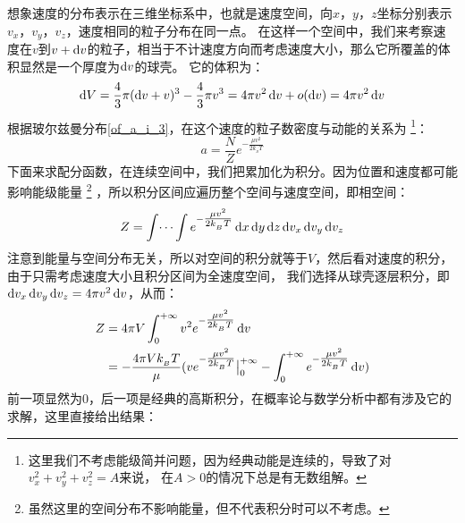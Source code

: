        \begin{prove}            
            想象速度的分布表示在三维坐标系中，也就是速度空间，向$x$，$y$，$z$坐标分别表示$v_x$，$v_y$，$v_z$，速度相同的粒子分布在同一点。
            在这样一个空间中，我们来考察速度在$v$到$v+\dif{v}$的粒子，相当于不计速度方向而考虑速度大小，那么它所覆盖的体积显然是一个厚度为$\dif{v}$的球壳。
            它的体积为：
            \begin{equation}
                \dif{V} = \frac{4}{3}\pi (\dif{v}+v)^{3} - \frac{4}{3}\pi v^{3} = 4\pi v^{2}\dif{v} + o(\dif{v}) = 4\pi v^{2}\dif{v}
            \end{equation}
            根据玻尔兹曼分布\ref{of_a_i_3}，在这个速度的粒子数密度与动能的关系为
            \footnote{这里我们不考虑能级简并问题，因为经典动能是连续的，导致了对$v_{x}^{2}+v_{y}^{2}+v_{z}^{2}=A$来说，
            在$A>0$的情况下总是有无数组解。}：
            \begin{equation}
                a= \frac{N}{Z} e^{-\tfrac{\mu v^{2}}{2k_{_B}T}}
            \end{equation}
            下面来求配分函数，在连续空间中，我们把累加化为积分。因为位置和速度都可能影响能级能量
            \footnote{虽然这里的空间分布不影响能量，但不代表积分时可以不考虑。}
            ，所以积分区间应遍历整个空间与速度空间，即相空间：
            \begin{equation}
                Z =\int \dots \int e^{-\tfrac{\mu v^{2}}{2k_{_B}T}} \dif{x}\dif{y}\dif{z}\dif{v_x}\dif{v_y}\dif{v_z}
            \end{equation}
            注意到能量与空间分布无关，所以对空间的积分就等于$V$，然后看对速度的积分，由于只需考虑速度大小且积分区间为全速度空间，
            我们选择从球壳逐层积分，即$\dif{v_x}\dif{v_y}\dif{v_z} = 4\pi v^{2}\dif{v}$，从而：
            \begin{equation}
                \begin{aligned}
                    Z &= 4\pi V\int_{0}^{+\infty} v^{2} e^{-\tfrac{\mu v^{2}}{2k_{_B}T}} \dif{v}\\
                      &= -\frac{4 \pi V k_{_B}T}{\mu} (ve^{-\tfrac{\mu v^{2}}{2k_{_B}T}}\big|_{0}^{+\infty} - \int_{0}^{+\infty} e^{-\tfrac{\mu v^{2}}{2k_{_B}T}} \dif{v})
                \end{aligned}
            \end{equation}
            前一项显然为0，后一项是经典的高斯积分，在概率论与数学分析中都有涉及它的求解，这里直接给出结果：
            \begin{equation}

\end{equation}
\end{prove}
